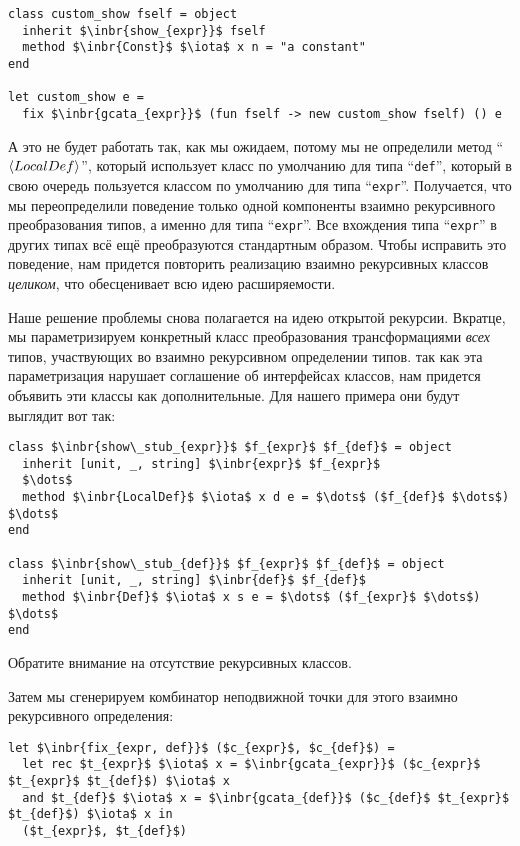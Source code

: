 \begin{lstlisting}
class custom_show fself = object 
  inherit $\inbr{show_{expr}}$ fself
  method $\inbr{Const}$ $\iota$ x n = "a constant"
end

let custom_show e = 
  fix $\inbr{gcata_{expr}}$ (fun fself -> new custom_show fself) () e
\end{lstlisting}

А это не будет работать так, как мы ожидаем, потому мы не определили метод
``$\left<LocalDef\right>$'', который использует класс по умолчанию для типа  ``\lstinline{def}'', который в свою очередь пользуется классом по умолчанию для типа  ``\lstinline{expr}''.
Получается, что мы переопределили поведение только одной компоненты взаимно рекурсивного преобразования типов, а именно для типа ``\lstinline{expr}''. 
Все вхождения типа ``\lstinline{expr}'' в других типах всё ещё преобразуются стандартным образом. Чтобы исправить это поведение, нам придется повторить реализацию взаимно рекурсивных классов \emph{целиком}, что обесценивает всю идею расширяемости.

Наше решение проблемы снова полагается на идею открытой рекурсии. Вкратце, мы параметризируем конкретный класс преобразования трансформациями \emph{всех} типов, участвующих во взаимно рекурсивном определении типов.
так как эта параметризация нарушает соглашение об интерфейсах классов, нам придется объявить эти классы как дополнительные. Для нашего примера они будут выглядит вот так:

\begin{lstlisting}
class $\inbr{show\_stub_{expr}}$ $f_{expr}$ $f_{def}$ = object 
  inherit [unit, _, string] $\inbr{expr}$ $f_{expr}$
  $\dots$
  method $\inbr{LocalDef}$ $\iota$ x d e = $\dots$ ($f_{def}$ $\dots$) $\dots$
end

class $\inbr{show\_stub_{def}}$ $f_{expr}$ $f_{def}$ = object 
  inherit [unit, _, string] $\inbr{def}$ $f_{def}$
  method $\inbr{Def}$ $\iota$ x s e = $\dots$ ($f_{expr}$ $\dots$) $\dots$
end
\end{lstlisting}

Обратите внимание на отсутствие рекурсивных классов.

Затем мы сгенерируем комбинатор неподвижной точки для этого взаимно рекурсивного определения:

\begin{lstlisting}
let $\inbr{fix_{expr, def}}$ ($c_{expr}$, $c_{def}$) =
  let rec $t_{expr}$ $\iota$ x = $\inbr{gcata_{expr}}$ ($c_{expr}$ $t_{expr}$ $t_{def}$) $\iota$ x
  and $t_{def}$ $\iota$ x = $\inbr{gcata_{def}}$ ($c_{def}$ $t_{expr}$ $t_{def}$) $\iota$ x in
  ($t_{expr}$, $t_{def}$)
\end{lstlisting}

